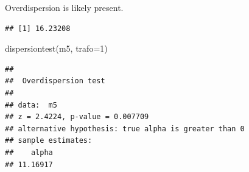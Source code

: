 \documentclass[
  ignorenonframetext,
]{beamer}
\newenvironment{Shaded}{\begin{snugshade}}{\end{snugshade}}
\newcommand{\AttributeTok}[1]{\textcolor[rgb]{0.77,0.63,0.00}{#1}}
\newcommand{\DecValTok}[1]{\textcolor[rgb]{0.00,0.00,0.81}{#1}}
\newcommand{\DocumentationTok}[1]{\textcolor[rgb]{0.56,0.35,0.01}{\textbf{\textit{#1}}}}
\newcommand{\FunctionTok}[1]{\textcolor[rgb]{0.00,0.00,0.00}{#1}}
\newcommand{\NormalTok}[1]{#1}
\newcommand{\OtherTok}[1]{\textcolor[rgb]{0.56,0.35,0.01}{#1}}
\newcommand{\SpecialCharTok}[1]{\textcolor[rgb]{0.00,0.00,0.00}{#1}}
\newcommand{\StringTok}[1]{\textcolor[rgb]{0.31,0.60,0.02}{#1}}
\begin{document}
\begin{frame}[fragile]{}
\protect\hypertarget{section-21}{}
Overdispersion is likely present.

\vspace{12pt}
\tiny

\begin{Shaded}
\end{Shaded}

\begin{verbatim}
## [1] 16.23208
\end{verbatim}

\vspace{12pt}
\tiny

\begin{Shaded}
\begin{Highlighting}[]
\FunctionTok{dispersiontest}\NormalTok{(m5, }\AttributeTok{trafo=}\DecValTok{1}\NormalTok{)}
\end{Highlighting}
\end{Shaded}

\begin{verbatim}
## 
##  Overdispersion test
## 
## data:  m5
## z = 2.4224, p-value = 0.007709
## alternative hypothesis: true alpha is greater than 0
## sample estimates:
##    alpha 
## 11.16917
\end{verbatim}
\end{frame}
\end{document}
